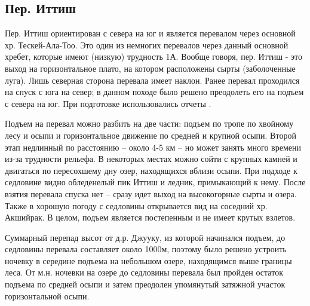 \subsection{Пер. Иттиш}

Пер. Иттиш ориентирован с севера на юг и является перевалом через основной хр. Тескей-Ала-Тоо. Это один из немногих перевалов через данный основной хребет, которые имеют (низкую) трудность 1А. Вообще говоря, пер. Иттиш - это выход на горизонтальное плато, на котором расположены сырты (заболоченные луга). Лишь северная сторона перевала имеет наклон. Ранее \cite{kovinov2021,sergeev2024,tipsina2024} перевал проходился на спуск с юга на север; в данном походе было решено преодолеть его на подъем с севера на юг. При подготовке использовались отчеты \cite{kovinov2021,sergeev2024,tipsina2024}.

Подъем на перевал можно разбить на две части: подъем по тропе по хвойному лесу и осыпи и горизонтальное движение по средней и крупной осыпи. Второй этап недлинный по расстоянию -- около 4-5 км -- но может занять много времени из-за трудности рельефа. В некоторых местах можно сойти с крупных камней и двигаться по пересохшему дну озер, находящихся вблизи осыпи. При подходе к седловине видно обледенелый пик Иттиш и ледник, примыкающий к нему. После взятия перевала спуска нет -- сразу идет выход на высокогорные сырты и озера. Также в хорошую погоду с седловины открывается вид на соседний хр. Акшийрак. В целом, подъем является постепенным и не имеет крутых взлетов.

Суммарный перепад высот от д.р. Джууку, из которой начинался подъем, до седловины перевала составляет около 1000м, поэтому было решено устроить ночевку в середине подъема на небольшом озере, находящимся выше границы леса. От м.н. ночевки на озере до седловины перевала был пройден остаток подъема по средней осыпи и затем преодолен упомянутый затяжной участок горизонтальной осыпи.